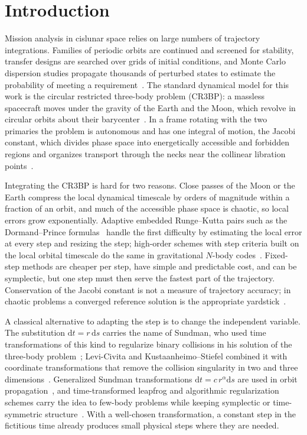 \documentclass[10pt,letterpaper]{article}
\newcommand{\dd}{\mathrm{d}}
\begin{document}
\clearpage
{}
\linenumbers

\section*{Introduction}
Mission analysis in cislunar space relies on large numbers of trajectory integrations. Families of periodic orbits are continued and screened for stability, transfer designs are searched over grids of initial conditions, and Monte Carlo dispersion studies propagate thousands of perturbed states to estimate the probability of meeting a requirement~\cite{koon2011,zimovan2020}. The standard dynamical model for this work is the circular restricted three-body problem (CR3BP): a massless spacecraft moves under the gravity of the Earth and the Moon, which revolve in circular orbits about their barycenter~\cite{szebehely1967}. In a frame rotating with the two primaries the problem is autonomous and has one integral of motion, the Jacobi constant, which divides phase space into energetically accessible and forbidden regions and organizes transport through the necks near the collinear libration points~\cite{szebehely1967,koon2011}.

Integrating the CR3BP is hard for two reasons. Close passes of the Moon or the Earth compress the local dynamical timescale by orders of magnitude within a fraction of an orbit, and much of the accessible phase space is chaotic, so local errors grow exponentially. Adaptive embedded Runge--Kutta pairs such as the Dormand--Prince formulas~\cite{dormand1980,hairer1993} handle the first difficulty by estimating the local error at every step and resizing the step; high-order schemes with step criteria built on the local orbital timescale do the same in gravitational $N$-body codes~\cite{rein2015,pham2024}. Fixed-step methods are cheaper per step, have simple and predictable cost, and can be symplectic, but one step must then serve the fastest part of the trajectory. Conservation of the Jacobi constant is not a measure of trajectory accuracy; in chaotic problems a converged reference solution is the appropriate yardstick~\cite{boekholt2015}.

A classical alternative to adapting the step is to change the independent variable. The substitution $\dd t = r\,\dd s$ carries the name of Sundman, who used time transformations of this kind to regularize binary collisions in his solution of the three-body problem~\cite{sundman1913}; Levi-Civita and Kustaanheimo--Stiefel combined it with coordinate transformations that remove the collision singularity in two and three dimensions~\cite{levicivita1920,kustaanheimo1965}. Generalized Sundman transformations $\dd t = c\,r^{\alpha}\dd s$ are used in orbit propagation~\cite{berry2002}, and time-transformed leapfrog and algorithmic regularization schemes carry the idea to few-body problems while keeping symplectic or time-symmetric structure~\cite{mikkola1999,preto1999,wang2020}. With a well-chosen transformation, a constant step in the fictitious time already produces small physical steps where they are needed.
\end{document}
